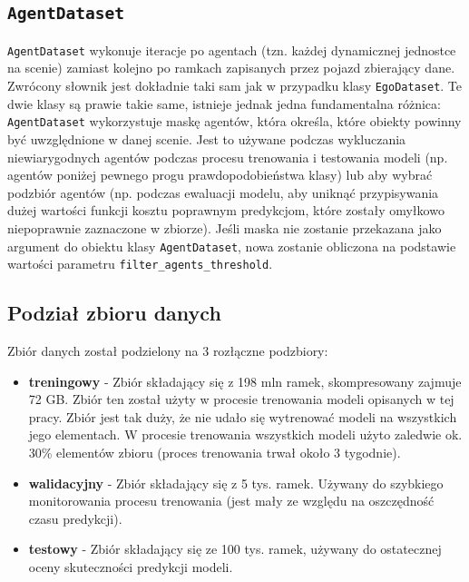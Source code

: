 \subsection{\texttt{AgentDataset}}

\texttt{AgentDataset} wykonuje iteracje po agentach (tzn. każdej dynamicznej jednostce na scenie) zamiast kolejno po ramkach zapisanych przez pojazd zbierający dane. Zwrócony słownik jest dokładnie taki sam jak w przypadku klasy \texttt{EgoDataset}. Te dwie klasy są prawie takie same, istnieje jednak jedna fundamentalna różnica: \texttt{AgentDataset} wykorzystuje maskę agentów, która określa, które obiekty powinny być uwzględnione w danej scenie. Jest to używane podczas wykluczania niewiarygodnych agentów podczas procesu trenowania i testowania modeli (np. agentów poniżej pewnego progu prawdopodobieństwa klasy) lub aby wybrać podzbiór agentów (np. podczas ewaluacji modelu, aby uniknąć przypisywania dużej wartości funkcji kosztu poprawnym predykcjom, które zostały omyłkowo niepoprawnie zaznaczone w zbiorze). Jeśli maska nie zostanie przekazana jako argument do obiektu klasy \texttt{AgentDataset}, nowa zostanie obliczona na podstawie wartości parametru \texttt{filter\_agents\_threshold}.

\newpage

\subsection{Podział zbioru danych}

\noindent
Zbiór danych został podzielony na 3 rozłączne podzbiory:

\begin{itemize}
    \setlength{\itemsep}{1pt}
    \setlength{\parskip}{0.2em}
    \setlength{\parsep}{0.2em}
    \item \textbf{treningowy} - Zbiór składający się z 198 mln ramek, skompresowany zajmuje 72 GB. Zbiór ten został użyty w procesie trenowania modeli opisanych w tej pracy. Zbiór jest tak duży, że nie udało się wytrenować modeli na wszystkich jego elementach. W procesie trenowania wszystkich modeli użyto zaledwie ok. 30\% elementów zbioru (proces trenowania trwał około 3 tygodnie).
    \item \textbf{walidacyjny} - Zbiór składający się z 5 tys. ramek. Używany do szybkiego monitorowania procesu trenowania (jest mały ze względu na oszczędność czasu predykcji).
    \item \textbf{testowy} - Zbiór składający się ze 100 tys. ramek, używany do ostatecznej oceny skuteczności predykcji modeli.
\end{itemize}

